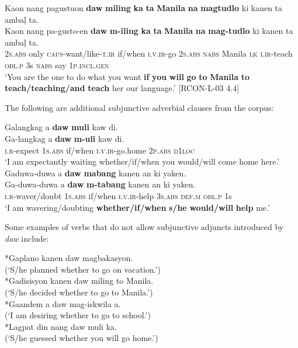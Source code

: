 \ea
\label{bkm:Ref115874703}
Kaon  nang  pagustuon  \textbf{daw}  \textbf{miling}  \textbf{ka}  \textbf{ta}  \textbf{Manila} \textbf{na}  \textbf{magtudlo}  ki  kanen  ta  ambaļ  ta. \smallskip\\
\gll Kaon  nang  pa-gusto-en  \textbf{daw}  \textbf{m-iling}  \textbf{ka}  \textbf{ta}  \textbf{Manila} \textbf{na}  \textbf{mag-tudlo}  ki  kanen  ta  ambaļ  ta. \\
2\textsc{s.abs}  only  \textsc{caus}-want/like-\textsc{t.ir}  if/when  \textsc{i.v.ir}-go  2\textsc{s.abs}  \textsc{nabs}  Manila
\textsc{lk}  \textsc{i.ir}-teach  \textsc{obl.p}  3s  \textsc{nabs}  say  1\textsc{p.incl.gen} \\
\glt ‘You are the one to do what you want \textbf{if} \textbf{you} \textbf{will} \textbf{go} \textbf{to} \textbf{Manila} \textbf{to} \textbf{teach/teaching/and} \textbf{teach} her our language.’ [RCON-L-03 4.4]
\z

The following are additional subjunctive adverbial clauses from the corpus:

\ea
Galangkag  a  \textbf{daw}  \textbf{muli}  kaw  di. \smallskip\\
\gll Ga-langkag  a  \textbf{daw}  \textbf{m-uli}  kaw  di. \\
\textsc{i.r}-expect  1\textsc{s.abs}  if/when  \textsc{i.v.ir}-go.home  2\textsc{p.abs}  \textsc{d}1\textsc{loc} \\
\glt ‘I am expectantly waiting whether/if/when you would/will come home here.’
\z
\ea
Gaduwa-duwa  a  \textbf{daw}  \textbf{mabang}  kanen  an  ki  yaken. \smallskip\\
\gll Ga-duwa-duwa  a  \textbf{daw}  \textbf{m-tabang}  kanen  an  ki  yaken. \\
\textsc{i.r}-waver/doubt  1\textsc{s.abs}  if/when  \textsc{i.v.ir}-help  3\textsc{s.abs}  \textsc{def.m}  \textsc{obl.p}  1s \\
\glt ‘I am wavering/doubting \textbf{whether/if/when} \textbf{s/he} \textbf{would/will} \textbf{help} me.’
\z

Some examples of verbs that do not allow subjunctive adjuncts introduced by \textit{daw} include:

\ea
*Gaplano kanen daw magbakasyon. \\
(‘S/he planned whether to go on vacation.’) \smallskip\\
*Gadisisyon kanen daw miling to Manila. \\ (‘S/he decided whether to go to Manila.’) \smallskip\\
*Gaandem a daw mag-iskwila a. \\
(‘I am desiring whether to go to school.’) \smallskip\\
*Lagpat din nang daw muli ka. \\
(‘S/he guessed whether you will go home.’)
\z

